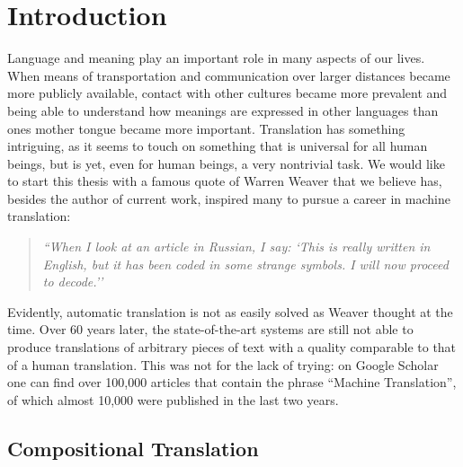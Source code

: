 %

%
\chapter{Introduction}

Language and meaning play an important role in many aspects of our lives. When means of transportation and communication over larger distances became more publicly available, contact with other cultures became more prevalent and being able to understand how meanings are expressed in other languages than ones mother tongue became more important. Translation has something intriguing, as it seems to touch on something that is universal for all human beings, but is yet, even for human beings, a very nontrivial task. We would like to start this thesis with a famous quote of Warren Weaver that we believe has, besides the author of current work, inspired many to pursue a career in machine translation:

\begin{quote}
\textit{``When I look at an article in Russian, I say: `This is really written in English, but it has been coded in some strange symbols. I will now proceed to decode.''} \citep{weaver1955translation}
\end{quote}

Evidently, automatic translation is not as easily solved as Weaver thought at the time. Over 60 years later, the state-of-the-art systems are still not able to produce translations of arbitrary pieces of text with a quality comparable to that of a human translation. This was not for the lack of trying: on Google Scholar one can find over 100,000 articles that contain the phrase ``Machine Translation'', of which almost 10,000 were published in the last two years.

\section*{Compositional Translation}


